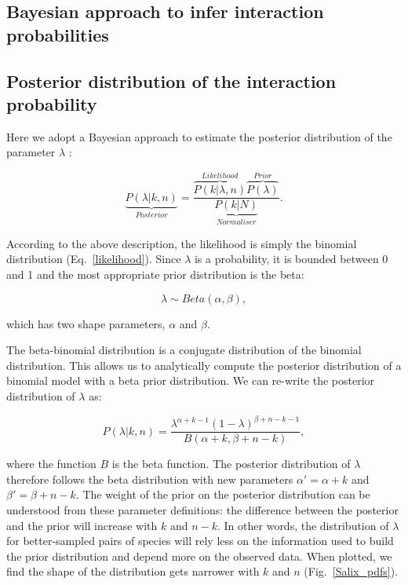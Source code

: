 \documentclass[12pt]{article}
\begin{document}
\begin{spacing}{2.0}
\section*{Bayesian approach to infer interaction probabilities}

    \subsection*{Posterior distribution of the interaction probability}

      Here we adopt a Bayesian approach to estimate the posterior distribution of the parameter $\lambda$ :

      \begin{equation}
        \underbrace{P(\lambda|k,n)}_{Posterior} = \frac{\overbrace{P(k|\lambda,n)}^{Likelihood}\overbrace{P(\lambda)}^{Prior}}{\underbrace{P(k|N)}_{Normaliser}} .
        \label{posterior}
      \end{equation}

      According to the above description, the likelihood is simply the binomial distribution (Eq.~\ref{likelihood}). Since $\lambda$ is a probability, it is bounded between 0 and 1 and the most appropriate prior distribution is the beta:

      \begin{equation}
        \lambda \sim Beta(\alpha,\beta) , \label{prior}
      \end{equation}

      \noindent which has two shape parameters, $\alpha$ and $\beta$. 

     The beta-binomial distribution is a conjugate distribution of the binomial distribution. This allows us to analytically compute the posterior distribution of a binomial model with a beta prior distribution. We can re-write the posterior distribution of $\lambda$ as:

      \begin{equation}
        P(\lambda|k,n) = \frac{\lambda^{\alpha+k-1}(1-\lambda)^{\beta+n-k-1}}{B(\alpha+k,\beta+n-k)} , \label{posterior2}
      \end{equation}

      
      \noindent where the function $B$ is the beta function. The posterior distribution of $\lambda$ therefore follows the beta distribution with new parameters $\alpha'= \alpha+k$ and $\beta'=\beta+n-k$. The weight of the prior on the posterior distribution can be understood from these parameter definitions: the difference between the posterior and the prior will increase with $k$ and $n-k$. In other words, the distribution of $\lambda$ for better-sampled pairs of species will rely less on the information used to build the prior distribution and depend more on the observed data.
      When plotted, we find the shape of the distribution gets narrower with $k$ and $n$ (Fig.~\ref{Salix_pdfs}). 



\end{spacing}
\end{document}
